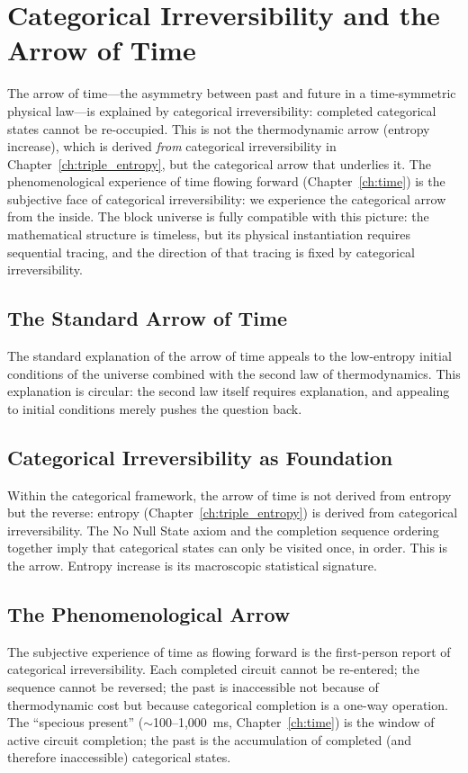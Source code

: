 \chapter{Categorical Irreversibility and the Arrow of Time}
\label{ch:arrow_of_time}

\begin{chapterabstract}
The arrow of time---the asymmetry between past and future in a time-symmetric physical law---is explained by categorical irreversibility: completed categorical states cannot be re-occupied. This is not the thermodynamic arrow (entropy increase), which is derived \emph{from} categorical irreversibility in Chapter~\ref{ch:triple_entropy}, but the categorical arrow that underlies it. The phenomenological experience of time flowing forward (Chapter~\ref{ch:time}) is the subjective face of categorical irreversibility: we experience the categorical arrow from the inside. The block universe is fully compatible with this picture: the mathematical structure is timeless, but its physical instantiation requires sequential tracing, and the direction of that tracing is fixed by categorical irreversibility.
\end{chapterabstract}

\section{The Standard Arrow of Time}

The standard explanation of the arrow of time appeals to the low-entropy initial conditions of the universe combined with the second law of thermodynamics. This explanation is circular: the second law itself requires explanation, and appealing to initial conditions merely pushes the question back.

\section{Categorical Irreversibility as Foundation}

Within the categorical framework, the arrow of time is not derived from entropy but the reverse: entropy (Chapter~\ref{ch:triple_entropy}) is derived from categorical irreversibility. The No Null State axiom and the completion sequence ordering together imply that categorical states can only be visited once, in order. This is the arrow. Entropy increase is its macroscopic statistical signature.

\section{The Phenomenological Arrow}

The subjective experience of time as flowing forward is the first-person report of categorical irreversibility. Each completed circuit cannot be re-entered; the sequence cannot be reversed; the past is inaccessible not because of thermodynamic cost but because categorical completion is a one-way operation. The ``specious present'' ($\sim$100--1,000~ms, Chapter~\ref{ch:time}) is the window of active circuit completion; the past is the accumulation of completed (and therefore inaccessible) categorical states.
